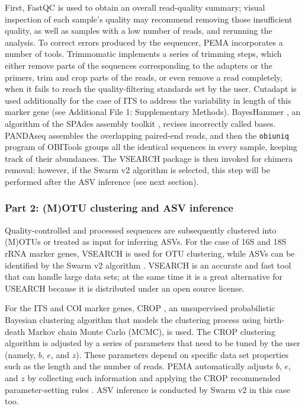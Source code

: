    First, FastQC \citep{fastqc} is used to obtain an overall read-quality summary; 
   visual inspection of each sample's quality may recommend removing those insufficient quality, 
   as well as samples with a low number of reads, and rerunning the analysis. 
   To correct errors produced by the sequencer, PEMA incorporates a number of tools. 
   Trimmomatic \citep{bolger2014trimmomatic} implements a series of trimming steps, 
   which either remove parts of the sequences corresponding to the adapters or the primers, 
   trim and crop parts of the reads, or even remove a read completely, when it fails to reach 
   the quality-filtering standards set by the user. 
   Cutadapt \citep{martin_cutadapt_2011} is used additionally for the case of ITS to address 
   the variability in length of this marker gene (see Additional File 1: Supplementary Methods). 
   BayesHammer \citep{nikolenko2013bayeshammer}, an algorithm of the 
   SPAdes assembly toolkit \citep{bankevich2012spades}, revises incorrectly called bases. 
   PANDAseq \citep{masella2012pandaseq} assembles the overlapping paired-end reads, 
   and then the \texttt{obiuniq} program of OBITools \citep{boyer2016obitools} groups 
   all the identical sequences in every sample, keeping track of their abundances. 
   The VSEARCH package \citep{rognes2016vsearch} is then invoked for chimera removal; 
   however, if the Swarm v2 algorithm is selected, this step will be performed 
   after the ASV inference (see next section).


   \subsubsection{Part 2: (M)OTU clustering and ASV inference}

   Quality-controlled and processed sequences are subsequently clustered into (M)OTUs or 
   treated as input for inferring ASVs. 
   For the case of 16S and 18S rRNA marker genes, VSEARCH \citep{rognes2016vsearch} 
   is used for OTU clustering, while ASVs can be identified by the 
   Swarm v2 algorithm \citep{mahe2015swarm}. 
   VSEARCH is an accurate and fast tool that can handle large data sets; 
   at the same time it is a great alternative for USEARCH \citep{edgar2010search} 
   because it is distributed under an open source license.

   For the ITS and COI marker genes, CROP \citep{hao2011clustering}, 
   an unsupervised probabilistic Bayesian clustering algorithm that models 
   the clustering process using birth-death Markov chain Monte Carlo (MCMC), is used. 
   The CROP clustering algorithm is adjusted by a series of parameters that need to be 
   tuned by the user (namely, $b$, $e$, and $z$).
   These parameters depend on specific data set properties such as the length 
   and the number of reads. 
   PEMA automatically adjusts $b$, $e$, and $z$ by collecting such information 
   and applying the CROP recommended parameter-setting rules \citep{hao2011clustering}. 
   ASV inference is conducted by Swarm v2 \citep{mahe2015swarm} in this case too.

